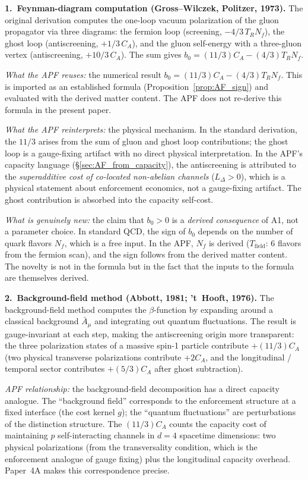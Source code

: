 \documentclass[11pt,a4paper]{article}
\theoremstyle{definition}
\begin{document}
\smallskip\noindent\textbf{1.\ Feynman-diagram computation
(Gross--Wilczek, Politzer, 1973).}\quad
The original derivation computes the one-loop vacuum polarization of
the gluon propagator via three diagrams: the fermion loop (screening,
$-4/3\, T_R N_f$), the ghost loop (antiscreening, $+1/3\, C_A$), and
the gluon self-energy with a three-gluon vertex (antiscreening,
$+10/3\, C_A$).  The sum gives $b_0 = (11/3)C_A - (4/3)T_R N_f$.

\textit{What the APF reuses:} the numerical result
$b_0 = (11/3)C_A - (4/3)T_R N_f$.  This is imported as an established
formula (Proposition~\ref{prop:AF_sign}) and evaluated with the
derived matter content.  The APF does not re-derive this formula in
the present paper.

\textit{What the APF reinterprets:} the physical mechanism.  In the
standard derivation, the $11/3$ arises from the sum of gluon and ghost
loop contributions; the ghost loop is a gauge-fixing artifact with no
direct physical interpretation.  In the APF's capacity language
(\S\ref{sec:AF_from_capacity}), the antiscreening is attributed to the
\emph{superadditive cost of co-located non-abelian channels}
($L_\Delta > 0$), which is a physical statement about enforcement
economics, not a gauge-fixing artifact.  The ghost contribution is
absorbed into the capacity self-cost.

\textit{What is genuinely new:} the claim that $b_0 > 0$ is a
\emph{derived consequence} of A1, not a parameter choice.  In
standard QCD, the sign of $b_0$ depends on the number of quark
flavors $N_f$, which is a free input.  In the APF, $N_f$ is derived
($T_{\mathrm{field}}$: 6 flavors from the fermion scan), and the
sign follows from the derived matter content.  The novelty is not in
the formula but in the fact that the inputs to the formula are
themselves derived.

\smallskip\noindent\textbf{2.\ Background-field method
(Abbott, 1981; 't~Hooft, 1976).}\quad
The background-field method computes the $\beta$-function by expanding
around a classical background $\bar{A}_\mu$ and integrating out
quantum fluctuations.  The result is gauge-invariant at each step,
making the antiscreening origin more transparent: the three
polarization states of a massive spin-1 particle contribute
$+(11/3)C_A$ (two physical transverse polarizations contribute
$+2C_A$, and the longitudinal / temporal sector contributes
$+(5/3)C_A$ after ghost subtraction).

\textit{APF relationship:} the background-field decomposition has a
direct capacity analogue.  The ``background field'' corresponds to
the enforcement structure at a fixed interface (the cost kernel $g$);
the ``quantum fluctuations'' are perturbations of the distinction
structure.  The $(11/3)C_A$ counts the capacity cost of maintaining $p$
self-interacting channels in $d = 4$ spacetime dimensions: two
physical polarizations (from the transversality condition, which is
the enforcement analogue of gauge fixing) plus the longitudinal
capacity overhead.  Paper~4A makes this correspondence precise.
\end{document}
